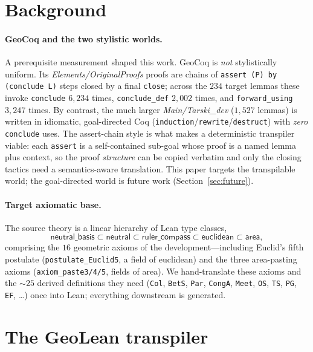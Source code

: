 \documentclass{article}
\begin{document}
\section{Background}

\paragraph{GeoCoq and the two stylistic worlds.}
A prerequisite measurement shaped this work. GeoCoq is \emph{not} stylistically uniform.
Its \emph{Elements/OriginalProofs} proofs are chains of \texttt{assert (P) by (conclude L)}
steps closed by a final \texttt{close}; across the $234$ target lemmas these invoke
\texttt{conclude} $6{,}234$ times, \texttt{conclude\_def} $2{,}002$ times, and
\texttt{forward\_using} $3{,}247$ times. By contrast, the much larger \emph{Main/Tarski\_dev}
($1{,}527$ lemmas) is written in idiomatic, goal-directed Coq
(\texttt{induction}/\texttt{rewrite}/\texttt{destruct}) with \emph{zero} \texttt{conclude} uses.
The assert-chain style is what makes a deterministic transpiler viable: each \texttt{assert} is
a self-contained sub-goal whose proof is a named lemma plus context, so the proof
\emph{structure} can be copied verbatim and only the closing tactics need a semantics-aware
translation. This paper targets the transpilable world; the goal-directed world is future work
(Section~\ref{sec:future}).

\paragraph{Target axiomatic base.}
The source theory is a linear hierarchy of Lean type classes,
\[
\textsf{neutral\_basis} \subset \textsf{neutral} \subset \textsf{ruler\_compass}
\subset \textsf{euclidean} \subset \textsf{area},
\]
comprising the $16$ geometric axioms of the development---including Euclid's fifth postulate
(\texttt{postulate\_Euclid5}, a field of \textsf{euclidean}) and the three area-pasting axioms
(\texttt{axiom\_paste3/4/5}, fields of \textsf{area}). We hand-translate these axioms and the
${\sim}25$ derived definitions they need (\texttt{Col}, \texttt{BetS}, \texttt{Par},
\texttt{CongA}, \texttt{Meet}, \texttt{OS}, \texttt{TS}, \texttt{PG}, \texttt{EF}, \ldots) once
into Lean; everything downstream is generated.

\section{The GeoLean transpiler}
\label{sec:transpiler}
\end{document}
